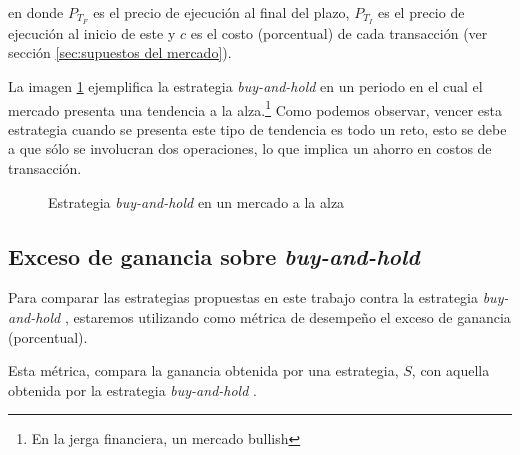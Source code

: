 \documentclass[12pt]{scrbook}
\theoremstyle{break}
\theoremstyle{break}
\newcommand{\buyhold}{\textit{buy-and-hold }}
\begin{document}
en donde $P_{T_F}$ es el precio de ejecución al final del plazo, $P_{T_I}$ es el precio de ejecución al inicio de este y $c$ es el costo (porcentual) de cada transacción (ver sección \ref{sec:supuestos del mercado}). 

La imagen \ref{imagen:buy hold alza} ejemplifica la estrategia \buyhold en un periodo en el cual el mercado presenta una tendencia a la alza.\footnote{En la jerga financiera, un mercado bullish} Como podemos observar, vencer esta estrategia cuando se presenta este tipo de tendencia es todo un reto, esto se debe a que sólo se involucran dos operaciones, lo que implica un ahorro en costos de transacción.

\begin{figure}[ht]
\centering
{}
\caption{\label{imagen:buy hold alza} Estrategia \buyhold en un mercado a la alza}
\end{figure}

\subsection{Exceso de ganancia sobre \buyhold}

Para comparar las estrategias propuestas en este trabajo contra la estrategia \buyhold, estaremos utilizando como métrica de desempeño el exceso de ganancia (porcentual).

Esta métrica, compara la ganancia obtenida por una estrategia, $S$, con aquella obtenida por la estrategia \buyhold.
\end{document}
